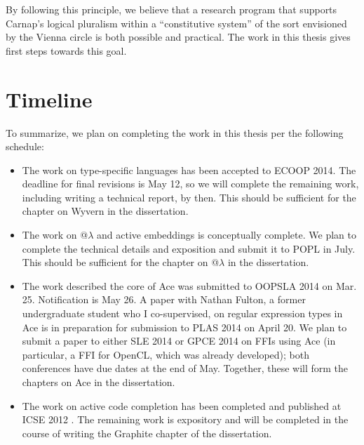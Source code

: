 By following this principle, we believe that a research program that supports Carnap's logical pluralism within a ``constitutive system'' of the sort envisioned by the Vienna circle is both possible and practical. The work in this thesis gives first steps towards this goal.




\section{Timeline}
To summarize, we plan on completing the work in this thesis per the following schedule:
\begin{itemize}
\item The work on type-specific languages has been accepted to ECOOP 2014. The deadline for final revisions is May 12, so we will complete the remaining work, including writing a technical report, by then. This should be sufficient for the chapter on Wyvern in the dissertation.
\item The work on @$\lambda$ and active embeddings is conceptually complete. We plan to complete the technical details and exposition and submit it to POPL in July. This should be sufficient for the chapter on @$\lambda$ in the dissertation.
\item The work described the core of Ace was submitted to OOPSLA 2014 on Mar. 25. Notification is May 26. A paper with Nathan Fulton, a former undergraduate student who I co-supervised, on regular expression types in Ace is in preparation for submission to PLAS 2014 on April 20. We plan to submit a paper to either SLE 2014 or GPCE 2014 on FFIs using Ace (in particular, a FFI for OpenCL, which was already developed); both conferences have due dates at the end of May. Together, these will form the chapters on Ace in the dissertation.
\item The work on active code completion has been completed and published at ICSE 2012 \cite{Omar:2012:ACC:2337223.2337324}. The remaining work is expository and will be completed in the course of writing the Graphite chapter of the dissertation.
\end{itemize}
